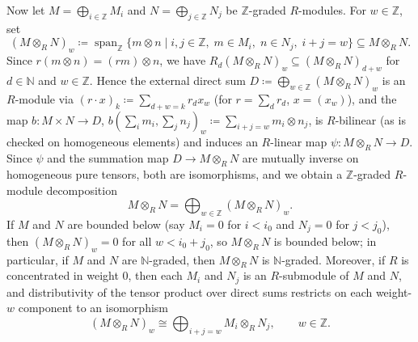 \documentclass[a4paper, 12pt, reqno]{amsart}
\theoremstyle{remark}
\begin{document}
Now let $M = \bigoplus_{i \in \mathbb{Z}} M_i$ and $N = \bigoplus_{j \in \mathbb{Z}} N_j$ be $\mathbb{Z}$-graded $R$-modules.
For $w \in \mathbb{Z}$, set
\begin{equation*}
  (M \otimes_R N)_w \coloneq \operatorname{span}_{\mathbb{Z}}\{m \otimes n \mid i, j \in \mathbb{Z},\; m \in M_i,\; n \in N_j,\; i + j = w\} \subseteq M \otimes_R N.
\end{equation*}
Since $r(m \otimes n) = (r m) \otimes n$,
we have $R_d (M \otimes_R N)_w \subseteq (M \otimes_R N)_{d + w}$ for $d \in \mathbb{N}$ and $w \in \mathbb{Z}$.
Hence the external direct sum $D \coloneq \bigoplus_{w \in \mathbb{Z}} (M \otimes_R N)_w$ is an $R$-module via $(r \cdot x)_k \coloneq \sum_{d + w = k} r_d x_w$ (for $r = \sum_d r_d$, $x = (x_w)$),
and the map $b \colon M \times N \to D$, $b(\sum_i m_i, \sum_j n_j)_w \coloneq \sum_{i + j = w} m_i \otimes n_j$, is $R$-bilinear (as is checked on homogeneous elements) and induces an $R$-linear map $\psi \colon M \otimes_R N \to D$.
Since $\psi$ and the summation map $D \to M \otimes_R N$ are mutually inverse on homogeneous pure tensors,
both are isomorphisms,
and we obtain a $\mathbb{Z}$-graded $R$-module decomposition
\begin{equation}
  \label{eq:app-ring-tensor-grading}
  M \otimes_R N = \bigoplus_{w \in \mathbb{Z}} (M \otimes_R N)_w.
\end{equation}
If $M$ and $N$ are bounded below (say $M_i = 0$ for $i < i_0$ and $N_j = 0$ for $j < j_0$),
then $(M \otimes_R N)_w = 0$ for all $w < i_0 + j_0$,
so $M \otimes_R N$ is bounded below;
in particular, if $M$ and $N$ are $\mathbb{N}$-graded,
then $M \otimes_R N$ is $\mathbb{N}$-graded.
Moreover, if $R$ is concentrated in weight $0$,
then each $M_i$ and $N_j$ is an $R$-submodule of $M$ and $N$,
and distributivity of the tensor product over direct sums restricts on each weight-$w$ component to an isomorphism
\begin{equation}
  \label{eq:app-r0-direct-sum}
  (M \otimes_R N)_w \cong \bigoplus_{i + j = w} M_i \otimes_R N_j, \qquad w \in \mathbb{Z}.
\end{equation}
\end{document}
